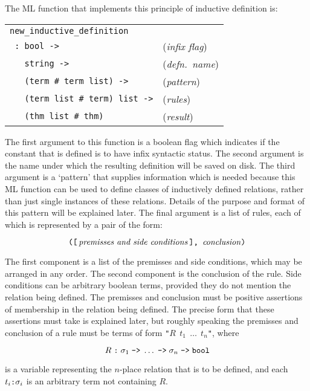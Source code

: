\documentclass[twocolumn,fleqn,layout]{article}
\begin{document}
The {\small ML} function that implements this principle of inductive definition
is:

\medskip

\noindent\begin{tabular}{@{\hskip\mathindent}l@{\hskip4.6mm}l@{}}
\verb!new_inductive_definition! & \mbox{} \\
\verb! : bool ->! & ({\it infix flag\/})\\
\verb!   string ->! & ({\it defn.\ name\/})\\
\verb!   (term # term list) ->! & ({\it pattern\/})\\
\verb!   (term list # term) list ->! & ({\it rules\/})\\
\verb!   (thm list # thm)! & ({\it result\/})
\end{tabular}

\medskip

\noindent The first argument to this function is a boolean flag which indicates
if the constant that is defined is to have infix syntactic status.  The second
argument is the name under which the resulting definition will be saved on
disk.  The third argument is a `pattern' that supplies information which is
needed because this {\small ML} function can be used to define classes of
inductively defined relations, rather than just single instances of these
relations. Details of the purpose and format of this pattern will be explained
later.  The final argument is a list of rules, each of which is represented by
a pair of the form:

\[ \hbox{\verb!([!}\,
\hbox{\it premisses and side conditions\/}\,\hbox{\verb!], !}
 \hbox{\it conclusion\/}\hbox{\verb!)!} \]

\noindent The first component is a list of the premisses and side conditions,
which may be arranged in any order.  The second component is the conclusion of
the rule.  Side conditions can be arbitrary boolean terms, provided they do not
mention the relation being defined.  The premisses and conclusion must be
positive assertions of membership in the relation being defined.  The precise
form that these assertions must take is explained later, but roughly speaking
the premisses and conclusion of a rule must be terms of form
\verb!"!$R\;\,t_1\;\,\dots\;\,t_n$\verb!"!, where

\[ R\; \hbox{\verb!:!}\; \sigma_1 \;\hbox{\verb!->!}\; \dots
\;\hbox{\verb!->!}\; \sigma_n \;\hbox{\verb!->!}\; \hbox{\verb!bool!}\]

\noindent is a variable representing the $n$-place relation that is to be
defined, and each $t_i \hbox{\verb!:!} \sigma_i$ is an arbitrary term not
containing $R$.
\end{document}
